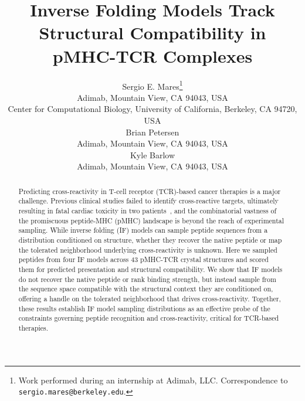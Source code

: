\documentclass{article}
\title{Inverse Folding Models Track Structural Compatibility in pMHC-TCR Complexes}
\author{Sergio E. Mares\thanks{Work performed during an internship at Adimab, LLC. Correspondence to \texttt{sergio.mares@berkeley.edu}.} \\
Adimab, Mountain View, CA 94043, USA \\
Center for Computational Biology, University of California, Berkeley, CA 94720, USA \\
\And
Brian Petersen \\
Adimab, Mountain View, CA 94043, USA \\
\And
Kyle Barlow \\
Adimab, Mountain View, CA 94043, USA \\
}
\begin{document}
\maketitle

\begin{abstract}
Predicting cross-reactivity in T-cell receptor (TCR)-based cancer therapies is a major challenge. Previous clinical studies failed to identify cross-reactive targets, ultimately resulting in fatal cardiac toxicity in two patients~\citep{linette2013cardiovascular,cameron2013titin}, and the combinatorial vastness of the promiscuous peptide-MHC (pMHC) landscape is beyond the reach of experimental sampling. While inverse folding (IF) models can sample peptide sequences from a distribution conditioned on structure, whether they recover the native peptide or map the tolerated neighborhood underlying cross-reactivity is unknown. Here we sampled peptides from four IF models across 43 pMHC-TCR crystal structures and scored them for predicted presentation and structural compatibility. We show that IF models do not recover the native peptide or rank binding strength, but instead sample from the sequence space compatible with the structural context they are conditioned on, offering a handle on the tolerated neighborhood that drives cross-reactivity. Together, these results establish IF model sampling distributions as an effective probe of the constraints governing peptide recognition and cross-reactivity, critical for TCR-based therapies.
\end{abstract}
\end{document}
